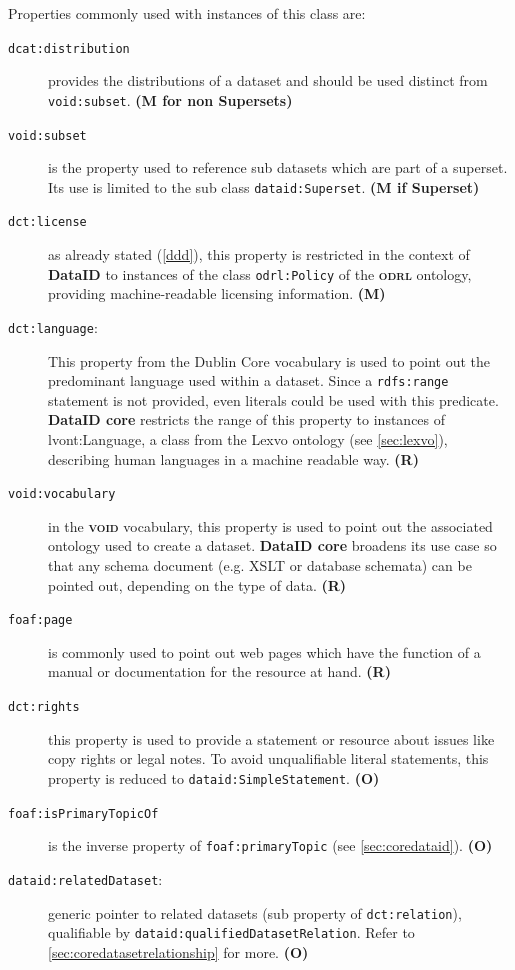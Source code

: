 \documentclass[a4paper,english,twoside,BCOR1.5cm,headsepline,DIV12,appendixprefix,final,12pt]{scrbook}
\newcommand{\dataid}{{\ttfamily\bfseries DataID}\xspace}
\newcommand{\core}{{\ttfamily\bfseries DataID core}\xspace}
\newcommand{\odrl}{{\scshape\bfseries odrl}\xspace}
\newcommand{\void}{{\scshape\bfseries void}\xspace}
\newcommand{\prop}[1]{{{\texttt{#1}}}}
\begin{document}
Properties commonly used with instances of this class are:
\begin{description}
\item[\prop{dcat:distribution}] provides the distributions of a dataset and should be used distinct from \prop{void:subset}. \textbf{(M for non Supersets)}
\item[\prop{void:subset}] is the property used to reference sub datasets which are part of a superset. Its use is limited to the sub class \prop{dataid:Superset}. \textbf{(M if Superset)}
\item[\prop{dct:license}] as already stated (\cref{ddd}), this property is restricted in the context of \dataid to instances of the class \prop{odrl:Policy} of the \odrl ontology, providing machine-readable licensing information. \textbf{(M)}
\item[\prop{dct:language}:] This property from the Dublin Core vocabulary is used to point out the predominant language used within a dataset. Since a \prop{rdfs:range} statement is not provided, even literals could be used with this predicate. \core restricts the range of this property to instances of  lvont:Language, a class from the Lexvo ontology (see \cref{sec:lexvo}), describing human languages in a machine readable way. \textbf{(R)}
\item[\prop{void:vocabulary}] in the \void vocabulary, this property is used to point out the associated ontology used to create a dataset. \core broadens its use case so that any schema document (e.g. XSLT or database schemata) can be pointed out, depending on the type of data. \textbf{(R)}
\item[\prop{foaf:page}] is commonly used to point out web pages which have the function of a manual or documentation for the resource at hand. \textbf{(R)}
\item[\prop{dct:rights}] this property is used to provide a statement or resource about issues like copy rights or legal notes. To avoid unqualifiable literal statements, this property is reduced to \prop{dataid:SimpleStatement}. \textbf{(O)}
\item[\prop{foaf:isPrimaryTopicOf}] is the inverse property of \prop{foaf:primaryTopic} (see \cref{sec:coredataid}). \textbf{(O)}
\item[\prop{dataid:relatedDataset}:] generic pointer to related datasets (sub property of \prop{dct:relation}), qualifiable by \prop{dataid:qualifiedDatasetRelation}. Refer to \cref{sec:coredatasetrelationship} for more. \textbf{(O)}

\end{description}
\end{document}
